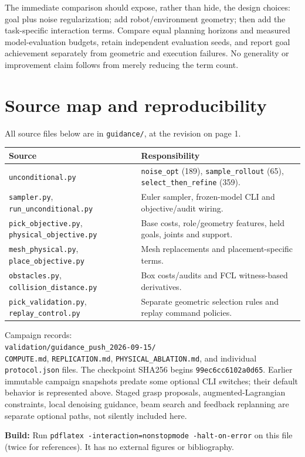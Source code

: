 \documentclass[10pt]{article}
\newcommand{\pathcode}[1]{\nolinkurl{#1}}
\begin{document}
The immediate comparison should expose, rather than hide, the design choices:
goal plus noise regularization; add robot/environment geometry; then add the
task-specific interaction terms. Compare equal planning horizons and measured
model-evaluation budgets, retain independent evaluation seeds, and report
goal achievement separately from geometric and execution failures. No
generality or improvement claim follows from merely reducing the term count.

\section{Source map and reproducibility}
All source files below are in \pathcode{guidance/}, at the revision on page 1.

\small
\begin{tabularx}{\linewidth}{@{}Y Y@{}}
\toprule
Source & Responsibility\\
\midrule
\pathcode{unconditional.py} & \pathcode{noise_opt} (189),
 \pathcode{sample_rollout} (65), \pathcode{select_then_refine} (359).\\
\pathcode{sampler.py}, \pathcode{run_unconditional.py} & Euler sampler,
 frozen-model CLI and objective/audit wiring.\\
\pathcode{pick_objective.py}, \pathcode{physical_objective.py} & Base costs,
 role/geometry features, held goals, joints and support.\\
\pathcode{mesh_physical.py}, \pathcode{place_objective.py} & Mesh replacements
 and placement-specific terms.\\
\pathcode{obstacles.py}, \pathcode{collision_distance.py} & Box costs/audits
 and FCL witness-based derivatives.\\
\pathcode{pick_validation.py}, \pathcode{replay_control.py} & Separate
 geometric selection rules and replay command policies.\\
\bottomrule
\end{tabularx}
\normalsize

Campaign records:\\
\pathcode{validation/guidance_push_2026-09-15/}\\
\pathcode{COMPUTE.md}, \pathcode{REPLICATION.md},
\pathcode{PHYSICAL_ABLATION.md}, and individual \pathcode{protocol.json} files.
The checkpoint SHA256 begins \pathcode{99ec6cc6102a0d65}.
Earlier immutable campaign snapshots predate some optional CLI switches;
their default behavior is represented above. Staged grasp proposals,
augmented-Lagrangian constraints, local denoising guidance, beam search and
feedback replanning are separate optional paths, not silently included here.

\textbf{Build:} Run \pathcode{pdflatex -interaction=nonstopmode -halt-on-error}
on this file (twice for references). It has no external figures or bibliography.
\end{document}
